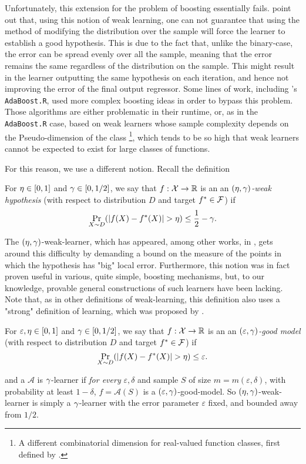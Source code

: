 \documentclass[12pt,a4paper,oneside,onecolumn]{book}
\begin{document}
Unfortunately,
this extension
for the problem of boosting essentially fails.
\citet[Remark 2.1]{DuffyHelmbold02}
point out that,
using this notion of
weak learning,
one can not guarantee
that using the method of
modifying the distribution over the sample
will force the learner
to establish a good hypothesis.
This is due to the fact that,
unlike the binary-case,
the error can be spread evenly
over all the sample,
meaning that the error remains the same
regardless of the distribution on the sample.
This might result in the learner
outputting the same hypothesis on each iteration,
and hence not improving the error
of the final output regressor.
Some lines of work, including
\citeauthor{FreundSchapire97}'s
{\tt AdaBoost.R},
used more complex boosting ideas in order to bypass this problem.
Those algorithms are either problematic in their runtime,
or, as in the {\tt AdaBoost.R} case, based on weak learners
whose sample complexity depends on the Pseudo-dimension of the class
\footnote{A different combinatorial dimension for real-valued function classes,
first defined by \citeauthor{pollard84}.},
which tends to be so high that weak learners cannot 
be expected to exist for large classes of functions.

For this reason, we use a different notion.
Recall the definition
\begin{definition}
  For $\eta \in [0,1]$ and $\gamma \in [0,1/2]$,
  we say that $f:\mathcal{X}\to\mathbb{R}$ is an  
  an \emph{$(\eta,\gamma)$-weak hypothesis}
  (with respect to distribution $D$ and target $f^*\in\mathcal{F}$)
  if $$\Pr_{X\sim D}(|f(X)-f^*(X)|>\dev)\le \frac12-\adv.$$
\end{definition}
The $(\eta,\gamma)$-weak-learner,
which has appeared, among other works, in
\citet{DBLP:journals/cpc/AnthonyBIS96,DBLP:journals/siamcomp/Simon97,avnimelech1999boosting,kegl2003robust},
gets around this difficulty
by demanding a bound on the measure of the
points  in which the hypothesis has "big" local error.
Furthermore, this notion was in fact proven useful
in various, quite simple, boosting mechanisms,
but, to our knowledge,
provable general constructions of such learners have been lacking.
Note that, as in other definitions of weak-learning,
this definition also uses a "strong" definition of learning,
which was proposed by \citeauthor{DBLP:journals/siamcomp/Simon97}.
\begin{definition}
  For $\varepsilon, \eta \in [0,1]$ and $\gamma \in [0,1/2]$,
  we say that $f:\mathcal{X}\to\mathbb{R}$ is an  
  an \emph{$(\varepsilon,\gamma)$-good model}
  (with respect to distribution $D$ and target $f^*\in\mathcal{F}$)
  if $$\Pr_{X\sim D}(|f(X)-f^*(X)|>\dev)\le \varepsilon.$$
\end{definition}
and a $\mathcal{A}$ is $\gamma$-learner
if \emph{for every} $\varepsilon, \delta$ and
sample $S$ of size $m=m(\varepsilon,\delta)$,
with probability at least $1-\delta$,
$f = \mathcal{A}(S)$ is a $(\varepsilon,\gamma)$-good-model.
So $(\eta,\gamma)$-weak-learner is simply
a $\gamma$-learner
with the error parameter $\varepsilon$ fixed,
and bounded away from $1/2$.
\end{document}
